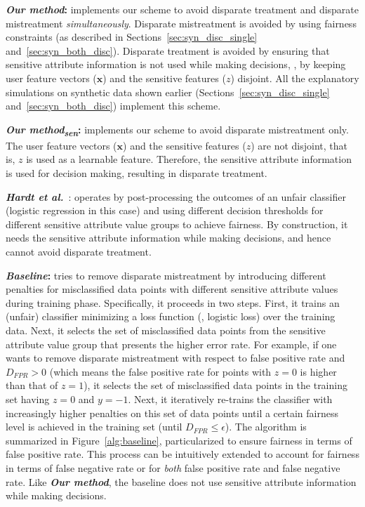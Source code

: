 \documentclass[letterpaper]{sig-alternate-2013}
\newcommand{\disc}{disparate mistreatment}
\newcommand{\Disc}{Disparate mistreatment}
\begin{document}
\noindent
\textbf{\textit{Our method}:} implements our scheme to avoid disparate treatment and
disparate mistreatment \textit{simultaneously}. \Disc{} is avoided by using fairness constraints
(as described in Sections~\ref{sec:syn_disc_single} and~\ref{sec:syn_both_disc}). Disparate treatment
is avoided by ensuring that sensitive attribute information is not used while making decisions, \ie, by
keeping user feature vectors ($\mathbf{x}$) and
the sensitive features ($z$) disjoint.
All the explanatory simulations on synthetic data shown earlier (Sections~\ref{sec:syn_disc_single} and~\ref{sec:syn_both_disc}) implement this scheme.

\noindent
\textbf{\textit{Our method\textsubscript{sen}}:}  implements our scheme to avoid disparate
mistreatment only. The user feature vectors ($\mathbf{x}$) and the sensitive features ($z$) are not
disjoint, that is, $z$ is used as a learnable feature. Therefore, the sensitive attribute information is
used for decision making, resulting in disparate treatment.

\noindent
\textbf{\textit{Hardt et al.}}~\cite{hardt_nips16}: operates by post-processing the outcomes of
an unfair classifier (logistic regression in this case) and using different decision thresholds for different sensitive attribute value groups
to achieve fairness. By construction, it needs the sensitive attribute information while making decisions,
and hence cannot avoid disparate treatment.

\noindent
\textbf{\textit{Baseline}:} tries to remove \disc{} by introducing different penalties for misclassified
data points with different sensitive attribute values during training phase. Specifically, it proceeds in two steps.
First, it trains an (unfair) classifier minimizing a loss function (\eg, logistic loss)
 over the training data. Next, it selects the set of misclassified data points from the sensitive attribute value group
 that presents the higher error rate. For example, if one wants to remove \disc{} with respect to false positive
rate and $D_{FPR}>0$ (which means the false positive rate for points with $z=0$ is higher than that of $z=1$), it
selects the set of misclassified data points in the training set having $z = 0$ and  $y = -1$. Next, it iteratively re-trains
the classifier with increasingly higher penalties on this set of data points until a certain fairness level is achieved
in the training set (until $D_{FPR}\leq \epsilon$).
The algorithm is summarized in Figure~\ref{alg:baseline}, particularized to ensure fairness in terms of false positive
rate. This process can be intuitively extended to account for fairness in terms of false negative rate or for \textit{both} false
positive rate and false negative rate.
Like \textbf{\textit{Our method}}, the baseline does not use sensitive attribute information while making decisions.
\end{document}
